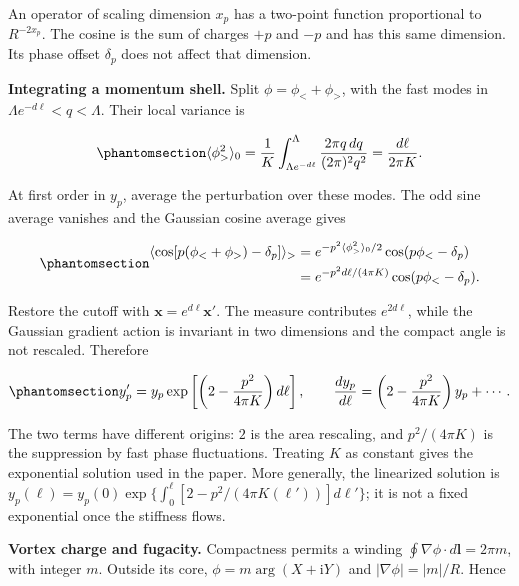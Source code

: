 An operator of scaling dimension \(x_p\) has a two-point function
proportional to \(R^{-2x_p}\). The cosine is the sum of charges \(+p\)
and \(-p\) and has this same dimension. Its phase offset \(\delta_p\)
does not affect that dimension.

\textbf{Integrating a momentum shell.} Split \(\phi=\phi_<+\phi_>\),
with the fast modes in \(\Lambda e^{-d\ell}<q<\Lambda\). Their local
variance is

\begin{equation}\phantomsection\label{eq-nbcp-clock-shell-variance}{
\langle\phi_>^2\rangle_0
=\frac1K\int_{\Lambda e^{-d\ell}}^\Lambda
\frac{2\pi q\,dq}{(2\pi)^2q^2}
=\frac{d\ell}{2\pi K}.
}\end{equation}

At first order in \(y_p\), average the perturbation over these modes.
The odd sine average vanishes and the Gaussian cosine average gives

\begin{equation}\phantomsection\label{eq-nbcp-clock-shell-cosine}{
\begin{aligned}
\langle\cos[p(\phi_<+\phi_>)-\delta_p]\rangle_>
&=e^{-p^2\langle\phi_>^2\rangle_0/2}
\cos(p\phi_<-\delta_p)\\
&=e^{-p^2d\ell/(4\pi K)}\cos(p\phi_<-\delta_p).
\end{aligned}
}\end{equation}

Restore the cutoff with \(\mathbf x=e^{d\ell}\mathbf x'\). The measure
contributes \(e^{2d\ell}\), while the Gaussian gradient action is
invariant in two dimensions and the compact angle is not rescaled.
Therefore

\begin{equation}\phantomsection\label{eq-nbcp-clock-pinning-flow}{
y_p'=y_p\exp\left[\left(2-\frac{p^2}{4\pi K}\right)d\ell\right],
\qquad
\frac{dy_p}{d\ell}=\left(2-\frac{p^2}{4\pi K}\right)y_p+\cdots.
}\end{equation}

The two terms have different origins: \(2\) is the area rescaling, and
\(p^2/(4\pi K)\) is the suppression by fast phase fluctuations. Treating
\(K\) as constant gives the exponential solution used in the paper. More
generally, the linearized solution is
\(y_p(\ell)=y_p(0)\exp\{\int_0^\ell[2-p^2/(4\pi K(\ell'))]d\ell'\}\); it
is not a fixed exponential once the stiffness flows.

\textbf{Vortex charge and fugacity.} Compactness permits a winding
\(\oint\nabla\phi\cdot d\mathbf l=2\pi m\), with integer \(m\). Outside
its core, \(\phi=m\arg(X+\mathrm iY)\) and \(|\nabla\phi|=|m|/R\). Hence


